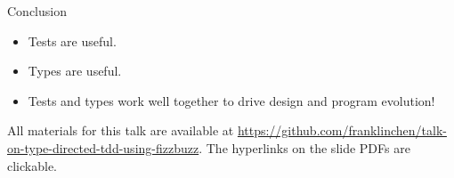 \begin{frame}{Conclusion}
  \begin{itemize}
  \item \alert{Tests} are useful.
  \item \alert{Types} are useful.
  \item Tests and types work well together to drive design and program evolution!
  \end{itemize}

  All materials for this talk are available at \url{https://github.com/franklinchen/talk-on-type-directed-tdd-using-fizzbuzz}. The hyperlinks on the slide PDFs are clickable.
\end{frame}





